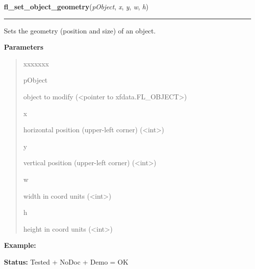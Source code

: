 \hspace{.8\funcindent}\begin{boxedminipage}{\funcwidth}

    \raggedright \textbf{fl\_set\_object\_geometry}(\textit{pObject}, \textit{x}, \textit{y}, \textit{w}, \textit{h})

    \vspace{-1.5ex}

    \rule{\textwidth}{0.5\fboxrule}
\setlength{\parskip}{2ex}
    Sets the geometry (position and size) of an object.

\setlength{\parskip}{1ex}
      \textbf{Parameters}
      \vspace{-1ex}

      \begin{quote}
        \begin{Ventry}{xxxxxxx}

          \item[pObject]

          object to modify ({\textless}pointer to 
          xfdata.FL\_OBJECT{\textgreater})

          \item[x]

          horizontal position (upper-left corner) 
          ({\textless}int{\textgreater})

          \item[y]

          vertical position (upper-left corner) 
          ({\textless}int{\textgreater})

          \item[w]

          width in coord units ({\textless}int{\textgreater})

          \item[h]

          height in coord units ({\textless}int{\textgreater})

        \end{Ventry}

      \end{quote}

\textbf{Example:} 

\textbf{Status:} Tested + NoDoc + Demo = OK



    \end{boxedminipage}

    \label{xformslib:library:fl_move_object}

